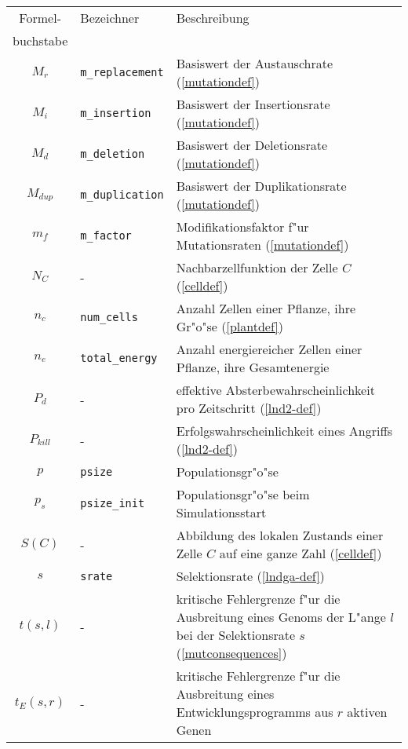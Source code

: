 \begin{appendix}
\noindent\begin{tabularx}{\linewidth}{|c|l|X|} \hline
Formel-      & Bezeichner               & Beschreibung \\
buchstabe    &                          & \\ \hline
$M_r$        & \verb|m_replacement|     & Basiswert der Austauschrate (\ref{mutationdef}) \\
$M_i$        & \verb|m_insertion|       & Basiswert der Insertionsrate (\ref{mutationdef}) \\
$M_d$        & \verb|m_deletion|        & Basiswert der Deletionsrate (\ref{mutationdef}) \\
$M_{\mathit{dup}}$  & \verb|m_duplication|     & Basiswert der Duplikationsrate (\ref{mutationdef}) \\
$m_f$        & \verb|m_factor|          & Modifikationsfaktor f"ur Mutationsraten (\ref{mutationdef}) \\
$N_C$        & -                        & Nachbarzellfunktion der Zelle $C$ (\ref{celldef}) \\
$n_c$        & \verb|num_cells|         & Anzahl Zellen einer Pflanze, ihre Gr"o"se (\ref{plantdef}) \\
$n_e$        & \verb|total_energy|      & Anzahl energiereicher Zellen einer Pflanze, ihre Gesamtenergie \\
$P_d$        & -                        & effektive Absterbewahrscheinlichkeit pro Zeitschritt (\ref{lnd2-def}) \\
$P_{\mathit{kill}}$ & -                        & Erfolgswahrscheinlichkeit eines Angriffs (\ref{lnd2-def}) \\
$p$          & \verb|psize|             & Populationsgr"o"se \\
$p_s$        & \verb|psize_init|        & Populationsgr"o"se beim Simulationsstart \\
$S(C)$       & -                        & Abbildung des lokalen Zustands einer Zelle $C$ auf eine ganze Zahl (\ref{celldef}) \\
$s$          & \verb|srate|             & Selektionsrate (\ref{lndga-def}) \\
$t(s,l)$     & -                        & kritische Fehlergrenze f"ur die Ausbreitung eines Genoms der L"ange $l$
                                          bei der Selektionsrate $s$ (\ref{mutconsequences}) \\
$t_E(s,r)$   & -                        & kritische Fehlergrenze f"ur die Ausbreitung eines Entwicklungsprogramms aus $r$ aktiven Genen

\end{tabularx}
\end{appendix}
